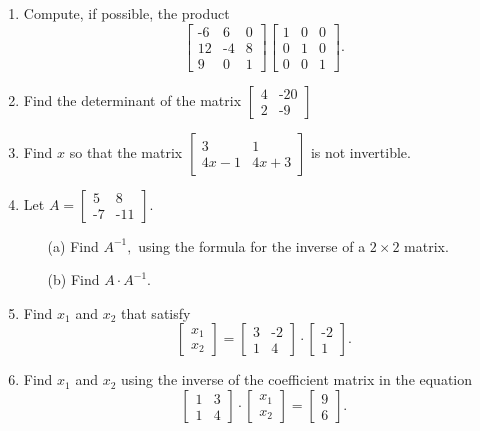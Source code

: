 \documentclass[11pt]{article} %
\begin{document}
\begin{enumerate}
\item Compute, if possible, the product 
$$\begin{bmatrix}
	\text{-}6 & 6 & 0 \\
	12 & \text{-}4 & 8 \\
	9  & 0& 1
\end{bmatrix}\begin{bmatrix}
1 & 0 & 0\\
0 & 1 & 0 \\
0 & 0 & 1
\end{bmatrix}.$$

\item Find the determinant of the matrix $\begin{bmatrix} 4 &\text{-}20 \\ 2 &\text{-}9\end{bmatrix}$

\item Find $x$ so that the matrix $\begin{bmatrix} 3 & 1 \\ 4x -1 & 4x + 3\end{bmatrix}$ is not invertible. 

\item Let $A = \begin{bmatrix} 5 &8\\ \text{-}7 &\text{-}11\end{bmatrix}.$
	\begin{enumerate}
		\item[(a)] Find $A^{-1},$ using the formula for the inverse of a $2\times 2$ matrix.  
		\item[(b)] Find $A \cdot A^{-1}.$
	\end{enumerate}



\item Find $x_1$ and $x_2$ that satisfy $$\begin{bmatrix} x_1 \\ x_2 \end{bmatrix} = \begin{bmatrix} 3 & \text{-}2 \\ 1 & 4 \end{bmatrix} \cdot \begin{bmatrix} \text{-}2 \\ 1 \end{bmatrix}.$$
\item Find $x_1$ and $x_2$ using the inverse of the coefficient matrix in the equation 
$$\begin{bmatrix} 1 & 3 \\ 1 & 4 \end{bmatrix} \cdot \begin{bmatrix} x_1 \\ x_2 \end{bmatrix} =  \begin{bmatrix} 9 \\ 6 \end{bmatrix}.$$


\end{enumerate}
\end{document}
